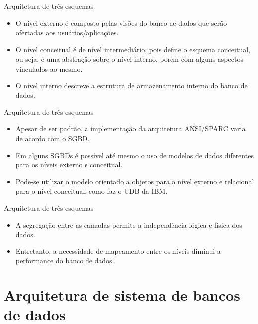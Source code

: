 \documentclass[11pt]{beamer}
\begin{document}
\begin{frame}{Arquitetura de três esquemas}
    \begin{itemize}
        \item O nível externo é composto pelas visões do banco de dados que serão ofertadas aos usuários/aplicações.
        \item O nível conceitual é de nível intermediário, pois define o esquema conceitual, ou seja, é uma abstração sobre o nível interno, porém com alguns aspectos vinculados ao mesmo.
        \item O nível interno descreve a estrutura de armazenamento interno do banco de dados.
    \end{itemize}
\end{frame}

\begin{frame}{Arquitetura de três esquemas}
    \begin{itemize}
        \item Apesar de ser padrão, a implementação da arquitetura ANSI/SPARC varia de acordo com o SGBD.
        \item Em alguns SGBDs é possível até mesmo o uso de modelos de dados diferentes para os níveis externo e conceitual.
        \item Pode-se utilizar o modelo orientado a objetos para o nível externo e relacional para o nível conceitual, como faz o UDB da IBM.
    \end{itemize}
\end{frame}

\begin{frame}{Arquitetura de três esquemas}
    \begin{itemize}
        \item A segregação entre as camadas permite a independência lógica e física dos dados.
        \item Entretanto, a necessidade de mapeamento entre os níveis diminui a performance do banco de dados.
    \end{itemize}
\end{frame}

\section{Arquitetura de sistema de bancos de dados}
\end{document}

